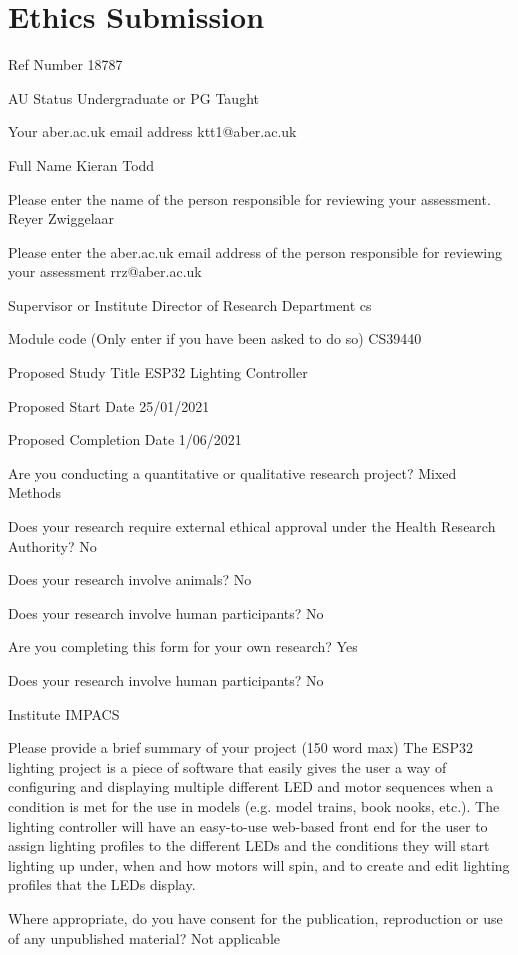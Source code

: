 \chapter{Ethics Submission}
Ref Number
18787

AU Status
Undergraduate or PG Taught

Your aber.ac.uk email address
ktt1@aber.ac.uk

Full Name
Kieran Todd

Please enter the name of the person responsible for reviewing your assessment.
Reyer Zwiggelaar

Please enter the aber.ac.uk email address of the person responsible for reviewing
your assessment
rrz@aber.ac.uk

Supervisor or Institute Director of Research Department
cs

Module code (Only enter if you have been asked to do so)
CS39440

Proposed Study Title
ESP32 Lighting Controller

Proposed Start Date
25/01/2021

Proposed Completion Date
1/06/2021

Are you conducting a quantitative or qualitative research project?
Mixed Methods

Does your research require external ethical approval under the Health Research
Authority?
No

Does your research involve animals?
No

Does your research involve human participants?
No

Are you completing this form for your own research?
Yes

Does your research involve human participants?
No

Institute
IMPACS

Please provide a brief summary of your project (150 word max)
The ESP32 lighting project is a piece of software that easily gives the user a way of
configuring and displaying multiple different LED and motor sequences when a condition
is met for the use in models (e.g. model trains, book nooks, etc.). The lighting controller
will have an easy-to-use web-based front end for the user to assign lighting profiles to
the different LEDs and the conditions they will start lighting up under, when and how
motors will spin, and to create and edit lighting profiles that the LEDs display.

Where appropriate, do you have consent for the publication, reproduction or use of
any unpublished material?
Not applicable